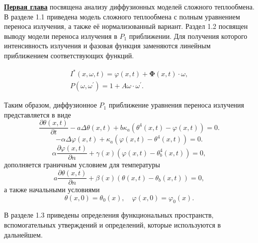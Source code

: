 \underline{\textbf{Первая глава}} посвящена анализу
диффузионных моделей сложного теплообмена.
В разделе 1.1 приведена модель сложного теплообмена с
полным уравнением переноса излучения, а также её нормализованный вариант.
Раздел 1.2 посвящен выводу модели переноса излучения в
$P_1$ приближении.
Для получения которого интенсивность излучения и фазовая функция заменяются линейным приближением
соответствующих функций.

\begin{gather*}
    I^{*}(x, \omega, t) = \varphi(x, t)
    +\boldsymbol{\Phi}(x, t) \cdot \omega, \label{eq:1_2:14}\\
    P\left(\omega, \omega^{\prime}\right)= 1
    + A \omega \cdot \omega^{\prime}. \label{eq:1_2:15}
\end{gather*}

Таким образом, диффузионное $P_1$ приближение уравнения переноса излучения
представляется в виде
\begin{equation}
    \label{eq:1_2:23}
    \frac{\partial \theta(x, t)}{\partial t}-a \Delta \theta(x, t)
    +b \kappa_{a}\left(\theta^{4}(x, t)-\varphi(x, t)\right)=0.
\end{equation}
\begin{equation}
    \label{eq:1_2:21}
    - \alpha \Delta \varphi(x, t)+\kappa_{a}\left(\varphi(x, t)-\theta^{4}(x, t)\right)=0.
\end{equation}
\begin{equation}
    \label{eq:1_2:24}
    \alpha \frac{\partial \varphi(x, t)}{\partial n}+
    \gamma(x)\left(\varphi(x, t)-\theta_{b}^{4}(x, t)\right)=0,
\end{equation}
дополняется граничным условием для температуры
\begin{equation}
    \label{eq:1_2:25}
    a \frac{\partial \theta(x, t)}{\partial n}
    +\beta(x)\left(\theta(x, t)-\theta_{b}(x, t)\right)=0,
\end{equation}
а также начальными условиями
\begin{equation}
    \label{eq:1_2:26}
    \theta(x, 0)=\theta_{0}(x), \quad \varphi(x, 0)=\varphi_{0}(x).
\end{equation}

В разделе 1.3 приведены определения функциональных пространств,
вспомогательных утверждений и определений,
которые используются в дальнейшем.

